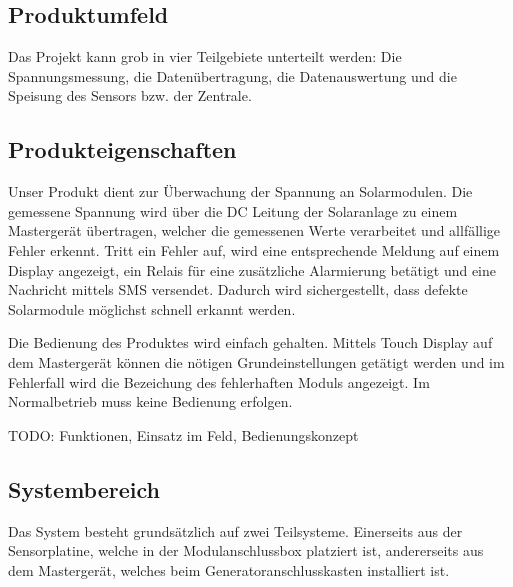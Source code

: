 \subsection{Produktumfeld}


Das   Projekt   kann  grob   in   vier   Teilgebiete  unterteilt   werden: Die
Spannungsmessung, die Daten\"ubertragung, die Datenauswertung und die Speisung
des Sensors bzw. der Zentrale.


\subsection{Produkteigenschaften}

Unser  Produkt  dient  zur  \"Uberwachung der  Spannung  an  Solarmodulen. Die
gemessene  Spannung  wird \"uber  die  DC  Leitung  der Solaranlage  zu  einem
Masterger\"at  \"ubertragen,  welcher  die gemessenen  Werte  verarbeitet  und
allf\"allige  Fehler erkennt. Tritt  ein Fehler  auf, wird  eine entsprechende
Meldung  auf einem  Display  angezeigt, ein  Relais  f\"ur eine  zus\"atzliche
Alarmierung bet\"atigt und eine  Nachricht mittels SMS versendet. Dadurch wird
sichergestellt, dass defekte Solarmodule m\"oglichst schnell erkannt werden.

Die Bedienung des  Produktes wird einfach gehalten. Mittels  Touch Display auf
dem Masterger\"at k\"onnen die  n\"otigen Grundeinstellungen get\"atigt werden
und im  Fehlerfall wird die  Bezeichung des fehlerhaften  Moduls angezeigt. Im
Normalbetrieb muss keine Bedienung erfolgen.

\textsc{TODO}: Funktionen, Einsatz im Feld, Bedienungskonzept


\subsection{Systembereich}

Das System  besteht grunds\"atzlich  auf zwei Teilsysteme. Einerseits  aus der
Sensorplatine, welche in der Modulanschlussbox platziert ist, andererseits aus
dem Masterger\"at, welches beim Generatoranschlusskasten installiert ist.

